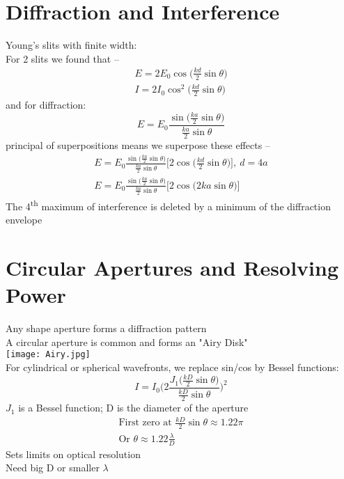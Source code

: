 \documentclass[a4paper, 11pt, fleqn, normalem]{report}
\begin{document}
\section{Diffraction and Interference}
Young's slits with finite width: \\
For 2 slits we found that --
\begin{gather*}
    E = 2E_{0}\cos{\Big(\frac{kd}{2}\sin{\theta}\Big)} \\
    I = 2I_{0}\cos^{2}{\Big(\frac{kd}{2}\sin{\theta}\Big)}
\end{gather*}
and for diffraction:
\begin{equation*}
    E = E_{0}\frac{\sin{\big(\tfrac{ka}{2}\sin{\theta}\big)}}{\tfrac{ka}{2}\sin{\theta}}
\end{equation*}
principal of superpositions means we superpose these effects --
\begin{gather*}
    E = E_{0}\frac{\sin{\big(\tfrac{ka}{2}\sin{\theta}\big)}}{\tfrac{ka}{2}\sin{\theta}}\Big[2\cos{\Big(\frac{kd}{2}\sin{\theta}\Big)}\Big],~d = 4a \\
    E = E_{0}\frac{\sin{\big(\tfrac{ka}{2}\sin{\theta}\big)}}{\tfrac{ka}{2}\sin{\theta}}\Big[2\cos{\Big(2ka\sin{\theta}\Big)}\Big]
\end{gather*}
The 4\textsuperscript{th} maximum of interference is deleted by a minimum of the diffraction envelope

\section{Circular Apertures and Resolving Power}
Any shape aperture forms a diffraction pattern \\
A circular aperture is common and forms an "Airy Disk" \\
\texttt{[image: Airy.jpg]} \\
For cylindrical or spherical wavefronts, we replace sin/cos by Bessel functions:
\begin{equation*}
    I = I_{0}\Bigg(2\frac{J_{1}\big(\tfrac{kD}{2}\sin{\theta}\big)}{\tfrac{kD}{2}\sin{\theta}}\Bigg)^{2}
\end{equation*}
$J_{1}$ is a Bessel function; D is the diameter of the aperture
\begin{gather*}
    \text{First zero at }\frac{kD}{2}\sin{\theta} \approx 1.22\pi \\
    \text{Or }\theta \approx 1.22\frac{\lambda}{D}
\end{gather*}
Sets limits on optical resolution \\
Need big D or smaller $\lambda$
\end{document}
